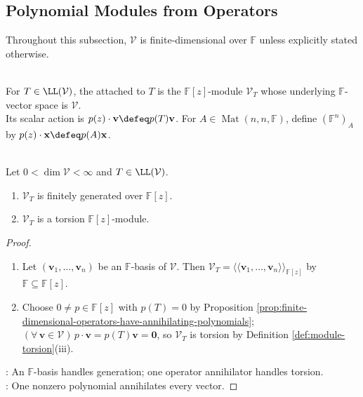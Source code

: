 \subsection{Polynomial Modules from Operators}

Throughout this subsection, $\mathcal{V}$ is finite-dimensional over $\mathbb{F}$ unless explicitly stated otherwise.

\begin{definition} \label{def:operator-module-and-matrix-module} \\
For $T\in\LL(\mathcal{V})$, the  attached to $T$ is the $\mathbb{F}[z]$-module $\mathcal{V}_T$ whose underlying $\mathbb{F}$-vector space is $\mathcal{V}$.\\
Its scalar action is $p(z)\cdot\mathbf{v}\defeq p(T)\mathbf{v}$. For $A\in\operatorname{Mat}(n,n,\mathbb{F})$, define $(\mathbb{F}^n)_A$ by $p(z)\cdot\mathbf{x}\defeq p(A)\mathbf{x}$.
\end{definition}

\begin{proposition} \label{prop:operator-modules-are-fg-torsion} \\
Let $0<\dim\mathcal{V}<\infty$ and $T\in\LL(\mathcal{V})$.
\begin{enumerate}[label=(\roman*)]
\setlength{\itemsep}{0pt}
\item $\mathcal{V}_T$ is finitely generated over $\mathbb{F}[z]$.
\item $\mathcal{V}_T$ is a torsion $\mathbb{F}[z]$-module.
\end{enumerate}
\begin{proof}
\begin{enumerate}[label=(\roman*)]
\setlength{\itemsep}{0pt}
\item Let $(\mathbf{v}_1,\ldots,\mathbf{v}_n)$ be an $\mathbb{F}$-basis of $\mathcal{V}$. Then $\mathcal{V}_T=\langle\!\langle\mathbf{v}_1,\ldots,\mathbf{v}_n\rangle\!\rangle_{\mathbb{F}[z]}$ by $\mathbb{F}\subseteq\mathbb{F}[z]$.
\item Choose $0\neq p\in\mathbb{F}[z]$ with $p(T)=0$ by Proposition \ref{prop:finite-dimensional-operators-have-annihilating-polynomials}; $(\forall\,\mathbf{v}\in\mathcal{V})\,p\cdot\mathbf{v}=p(T)\mathbf{v}=\mathbf{0}$, so $\mathcal{V}_T$ is torsion by Definition \ref{def:module-torsion}(iii).
\end{enumerate}
: An $\mathbb{F}$-basis handles generation; one operator annihilator handles torsion.\\
: One nonzero polynomial annihilates every vector.
\end{proof}
\end{proposition}

